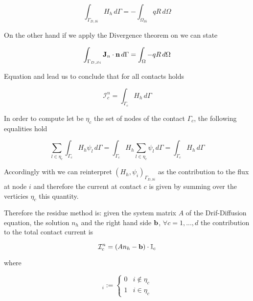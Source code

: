 \begin{equation}
\label{eq: conservative flux}
\int_{\Gamma_{D,Si}} H_h \, d\Gamma = - \int_{\Omega_{Si}} qR \, d \Omega
\end{equation}


On the other hand if we apply the Divergence theorem on  we can state 

\begin{equation}
\label{eq: lec divergence theor}
\int_{\Gamma_{D,Si}} \mathbf{J}_n \cdot \mathbf{n} \, d\Gamma = \int_{\Omega} - qR \, d\Omega
\end{equation}

Equation  and   lead us to conclude that for all contacts holds

\begin{equation}
\label{eq: flux current formula}
\mathcal{I}_c^n = \int_{\Gamma_c} H_h \, d\Gamma
\end{equation}

In order to compute  let be $\eta_{c}$ the set of nodes of the contact $\Gamma_c$, the following equalities hold

\begin{equation}
\label{eq: equalities integrals}
\sum_{l \in \eta_c} \int_{\Gamma_c} H_h \psi_l \, d\Gamma 
=  \int_{\Gamma_c} H_h \sum_{l \in \eta_{c}} \psi_l \,d\Gamma 
= \int_{\Gamma_c} H_h \, d\Gamma
\end{equation}


Accordingly with   we can reinterpret $(H_h,\psi_i)_{\Gamma_{D,Si}}$ as the contribution to the flux at node $i$ and therefore the current at contact $c$ is given by summing over the verticies $\eta_{c}$ this quantity.

Therefore the residue method is:
given the system matrix $A$ of the Drif-Diffusion equation, the solution $n_h$ and the right hand side $\mathbf{b}$, $\forall c = 1,...,d$ the contribution to the total contact current is

\begin{equation}
\mathcal{I}_c^n = (An_h-\mathbf{b})\cdot \mathbb{I}_c
\end{equation} 

where

\begin{equation}
[\mathbb{I}_c]_i := \left\{ \begin{array}{ll}
0 & i \notin \eta_c \\
1 & i \in \eta_c
\end{array}  \right.
\end{equation} 


